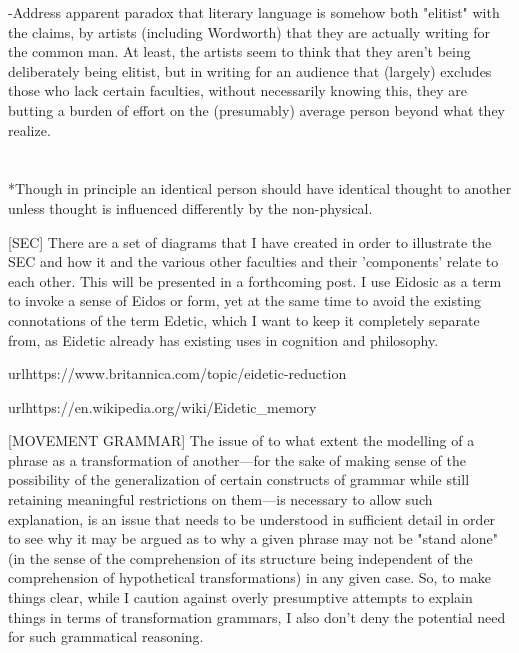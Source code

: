 \documentclass[]{article}
\begin{document}
-Address apparent paradox that literary language is somehow both "elitist" with the claims, by artists (including Wordworth) that they are actually writing for the common man. At least, the artists seem to think that they aren't being deliberately being elitist, but in writing for an audience that (largely) excludes those who lack certain faculties, without necessarily knowing this, they are butting a burden of effort on the (presumably) average person beyond what they realize.



\section{}



*Though in principle an identical person should have identical thought to another unless thought is influenced differently by the non-physical.



[SEC] There are a set of diagrams that I have created in order to illustrate the SEC and how it and the various other faculties and their 'components' relate to each other. This will be presented in a forthcoming post. I use Eidosic as a term to invoke a sense of Eidos or form, yet at the same time to avoid the existing connotations of the term Edetic, which I want to keep it completely separate from, as Eidetic already has existing uses in cognition and philosophy.



url{https://www.britannica.com/topic/eidetic-reduction}

url{https://en.wikipedia.org/wiki/Eidetic_memory}





[MOVEMENT GRAMMAR] The issue of to what extent the modelling of a phrase as a transformation of another—for the sake of making sense of the possibility of the generalization of certain constructs of grammar while still retaining meaningful restrictions on them—is necessary to allow such explanation, is an issue that needs to be understood in sufficient detail in order to see why it may be argued as to why a given phrase may not be "stand alone" (in the sense of the comprehension of its structure being independent of the comprehension of hypothetical transformations) in any given case. So, to make things clear, while I caution against overly presumptive attempts to explain things in terms of transformation grammars, I also don't deny the potential need for such grammatical reasoning.
\end{document}
